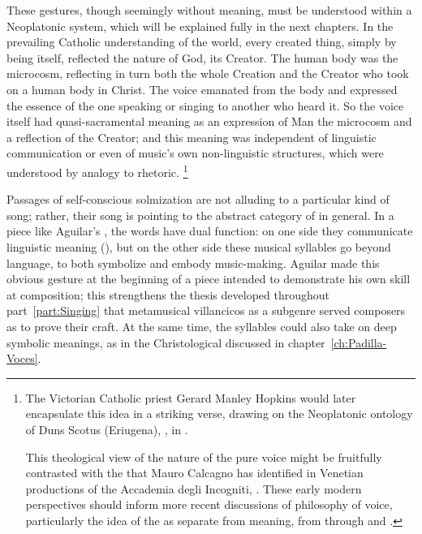 These gestures, though seemingly without meaning, must be understood within a Neoplatonic system, which will be explained fully in the next chapters.
In the prevailing Catholic understanding of the world, every created thing, simply by being itself, reflected the nature of God, its Creator.
The human body was the microcosm, reflecting in turn both the whole Creation and the Creator who took on a human body in Christ.
The voice emanated from the body and expressed the essence of the one speaking or singing to another who heard it.
So the voice itself had quasi-sacramental meaning as an expression of Man the microcosm and a reflection of the Creator; and this meaning was independent of linguistic communication or even of music's own non-linguistic structures, which were understood by analogy to rhetoric.%
	\footnote{%
The Victorian Catholic priest Gerard Manley Hopkins would later encapsulate this idea in a striking verse, drawing on the Neoplatonic ontology of Duns Scotus (Eriugena),  , in \autocite[95]{Hopkins:Poems}.

This theological view of the nature of the pure voice might be fruitfully contrasted with the  that Mauro Calcagno has identified in Venetian productions of the Accademia degli Incogniti, .
These early modern perspectives should inform more recent discussions of philosophy of voice, particularly the idea of the  as separate from meaning, from \autocite{Barthes:GrainOfVoice} through \autocite{Dolar:Voice} and \autocite{Cavarero:Voice}.
	}

Passages of self-conscious solmization are not alluding to a particular kind of song; rather, their song is pointing to the abstract category of  in general.
In a piece like Aguilar's , the words have dual function: on one side they communicate linguistic meaning (), but on the other side these musical syllables go beyond language, to both symbolize and embody music-making. 
Aguilar made this obvious gesture at the beginning of a piece intended to demonstrate his own skill at composition; this strengthens the thesis developed throughout part~\ref{part:Singing} that metamusical villancicos as a subgenre served composers as  to prove their craft.
At the same time, the syllables could also take on deep symbolic meanings, as in the Christological  discussed in chapter~\ref{ch:Padilla-Voces}.

